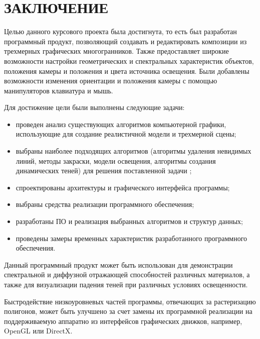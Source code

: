 \section*{\centering ЗАКЛЮЧЕНИЕ}

Целью данного курсового проекта была достигнута, то есть был разработан программный продукт, позволяющий создавать и редактировать композиции из трехмерных графических многогранников. Также предоставляет широкие возможности настройки геометрических и спектральных характеристик объектов, положения камеры и положения и цвета источника освещения. Были добавлены возможности изменения ориентации и положения камеры с помощью манипуляторов клавиатура и мышь.

Для достижение цели были выполнены следующие задачи:
\begin{itemize}
	\item проведен анализ существующих алгоритмов компьютерной графики, использующие для создание реалистичной модели и трехмерной сцены;
	\item выбраны наиболее подходящих алгоритмов (алгоритмы удаления невидимых линий, методы закраски, модели освещения, алгоритмы создания динамических теней) для решения поставленной задачи ;
	\item спроектированы архитектуры и графического интерфейса программы;
	\item выбраны средства реализации программного обеспечения;
	\item разработаны ПО и реализация выбранных алгоритмов и структур данных;
	\item проведены замеры временных характеристик разработанного программного обеспечения.  
\end{itemize}

Данный программный продукт может быть использован для демонстрации спектральной и диффузной отражающей способностей различных материалов, а также для визуализации падения теней при различных условиях освещенности. 

Быстродействие низкоуровневых частей программы, отвечающих за растеризацию полигонов, может быть улучшено за счет замены их программной реализации на поддерживаемую аппаратно из интерфейсов графических движков, например, OpenGL или DirectX.

